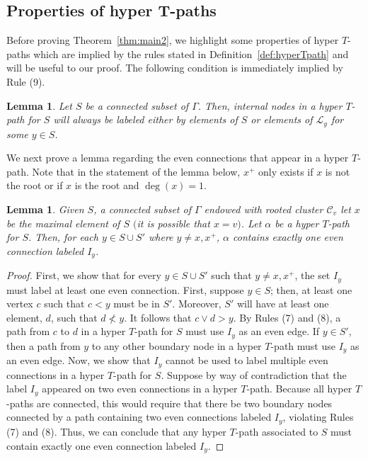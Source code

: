 \documentclass[10pt,a4paper]{amsart}
\numberwithin{equation}{section}
\newtheorem{Lemma}[Theorem]{Lemma}
\begin{document}
\subsection[Properties of hyper T-paths]{Properties of hyper $\boldsymbol{T}$-paths}\label{sec:T-path-lems}
Before proving Theorem~\ref{thm:main2}, we highlight some properties of hyper $T$-paths which are implied by the rules stated in Definition~\ref{def:hyperTpath} and will be useful to our proof.
The following condition is immediately implied by Rule (9).
\begin{Lemma}\label{lem:internalnodes}
Let $S$ be a connected subset of $\Gamma$. Then, internal nodes in a hyper $T$-path for $S$ will always be labeled either by elements of $S$ or elements of $\mathcal{L}_y$ for some $y \in S$.
\end{Lemma}
We next prove a lemma regarding the even connections that appear in a hyper $T$-path. Note that in the statement of the lemma below, $x^+$ only exists if $x$ is not the root or if $x$ is the root and $\deg(x) = 1$.
\begin{Lemma}\label{lem:evenconnections}
Given $S$, a connected subset of $\Gamma$ endowed with rooted cluster $\mathcal{C}_v$ let $x$ be the maximal element of $S$ $($it is possible that $x = v)$. Let $\alpha$ be a hyper $T$-path for $S$. Then, for each $y \in S \cup S'$ where $y \neq x,x^+$, $\alpha$ contains exactly one even connection labeled $I_y$.
\end{Lemma}
\begin{proof}
First, we show that for every $y \in S \cup S'$ such that $y \neq x,x^+$, the set $I_y$ must label at least one even connection. First, suppose $y \in S$; then, at least one vertex $c$ such that $c<y$ must be in $S'$. Moreover, $S'$ will have at least one element, $d$, such that $d \nless y$. It follows that $c \vee d > y$. By Rules (7) and (8), a path from $c$ to $d$ in a hyper $T$-path for $S$ must use $I_y$ as an even edge.
If $y \in S'$, then a path from $y$ to any other boundary node in a hyper $T$-path must use $I_y$ as an even edge.
Now, we show that $I_y$ cannot be used to label multiple even connections in a hyper $T$-path for $S$. Suppose by way of contradiction that the label $I_y$ appeared on two even connections in a hyper $T$-path. Because all hyper $T$-paths are connected, this would require that there be two boundary nodes connected by a path containing two even connections labeled $I_y$, violating Rules (7) and (8). Thus, we can conclude that any hyper $T$-path associated to $S$ must contain exactly one even connection labeled $I_y$.
\end{proof}
\end{document}
